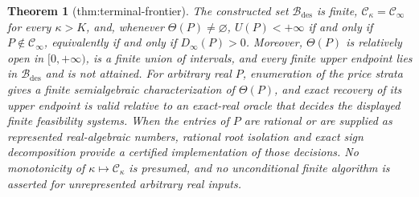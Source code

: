 \documentclass{article}
\newtheorem{theorem}{Theorem}
\begin{document}
\begin{theorem}[thm:terminal-frontier]\label{thm:terminal-frontier}
The constructed set \(\mathcal B_{\mathrm{des}}\) is finite, \(\mathcal C_\kappa=\mathcal C_\infty\) for every \(\kappa>K\), and, whenever \(\Theta(P)\ne\varnothing\), \(U(P)<+\infty\) if and only if \(P\notin\mathcal C_\infty\), equivalently if and only if \(D_\infty(P)>0\).  Moreover, \(\Theta(P)\) is relatively open in \([0,+\infty)\), is a finite union of intervals, and every finite upper endpoint lies in \(\mathcal B_{\mathrm{des}}\) and is not attained.  For arbitrary real \(P\), enumeration of the price strata gives a finite semialgebraic characterization of \(\Theta(P)\), and exact recovery of its upper endpoint is valid relative to an exact-real oracle that decides the displayed finite feasibility systems.  When the entries of \(P\) are rational or are supplied as represented real-algebraic numbers, rational root isolation and exact sign decomposition provide a certified implementation of those decisions.  No monotonicity of \(\kappa\mapsto\mathcal C_\kappa\) is presumed, and no unconditional finite algorithm is asserted for unrepresented arbitrary real inputs.
\end{theorem}
\end{document}
